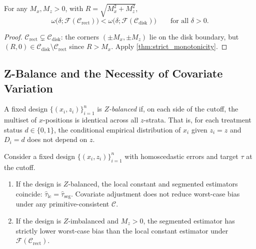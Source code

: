 \begin{corollary}\label{cor:strict_improvement}
	For any $M_x, M_z > 0$, with $R = \sqrt{M_x^2 + M_z^2}$,
	\begin{equation*}
		\omega\bigl(\delta; \mathcal{F}(\mathcal{C}_{\mathrm{rect}})\bigr) < \omega\bigl(\delta; \mathcal{F}(\mathcal{C}_{\mathrm{disk}})\bigr) \qquad \text{for all } \delta > 0.
	\end{equation*}
\end{corollary}

\begin{proof}
	$\mathcal{C}_{\mathrm{rect}} \subsetneq \mathcal{C}_{\mathrm{disk}}$: the corners $(\pm M_x, \pm M_z)$ lie on the disk boundary, but $(R, 0) \in \mathcal{C}_{\mathrm{disk}} \setminus \mathcal{C}_{\mathrm{rect}}$ since $R > M_x$.
	Apply \cref{thm:strict_monotonicity}.
\end{proof}


\subsection{Z-Balance and the Necessity of Covariate Variation}\label{sec:technical:zbalance}

\begin{definition}\label{def:z_balanced}
	A fixed design $\{(x_i, z_i)\}_{i=1}^n$ is \emph{$Z$-balanced} if, on each side of the cutoff, the multiset of $x$-positions is identical across all $z$-strata.
	That is, for each treatment status $d \in \{0,1\}$, the conditional empirical distribution of $x_i$ given $z_i = z$ and $D_i = d$ does not depend on $z$.
\end{definition}

\begin{proposition}\label{prop:z_imbalance}
	Consider a fixed design $\{(x_i, z_i)\}_{i=1}^n$ with homoscedastic errors and target $\tau$ at the cutoff.
	\begin{enumerate}
		\item If the design is $Z$-balanced, the local constant and segmented estimators coincide: $\hat\tau_{\mathrm{lc}} = \hat\tau_{\mathrm{seg}}$.
		Covariate adjustment does not reduce worst-case bias under any primitive-consistent $\mathcal{C}$.
		\item If the design is $Z$-imbalanced and $M_z > 0$, the segmented estimator has strictly lower worst-case bias than the local constant estimator under $\mathcal{F}(\mathcal{C}_{\mathrm{rect}})$.
	\end{enumerate}
\end{proposition}

